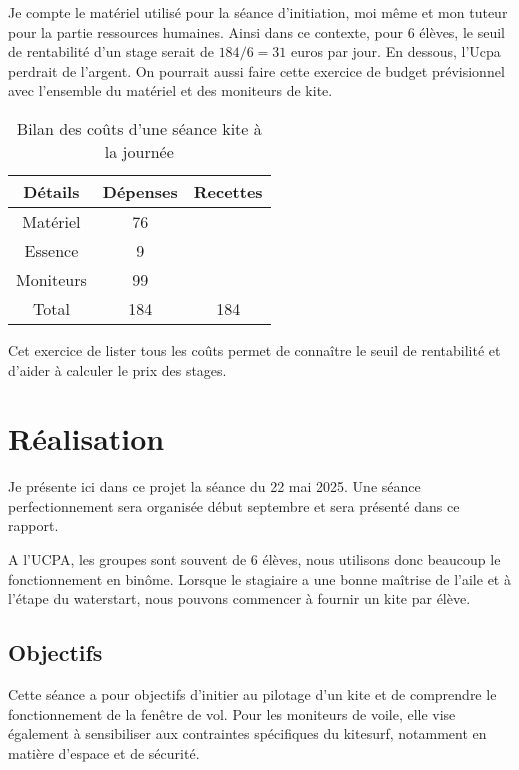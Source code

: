 \documentclass[11pt,a4paper]{report}
\begin{document}
Je compte le matériel utilisé pour la séance d’initiation,
moi m\^eme et mon tuteur pour la partie ressources humaines.
Ainsi dans ce contexte,  pour 6 élèves, le seuil de rentabilité
d'un stage serait de $184/6 = 31$ euros
par jour. En dessous, l'Ucpa perdrait de l'argent.
On pourrait aussi faire cette exercice de budget prévisionnel avec
l'ensemble du matériel et des moniteurs de kite.

\begin{table}
\begin{centering}
\begin{tabular}{|c|c|c|}
\hline
\textbf{Détails}         & \textbf{Dépenses} & \textbf{Recettes}   \\
\hline
Matériel  & 76     &                     \\
\hline                                    
Essence   & 9      &                     \\
\hline              
Moniteurs  & 99    &                     \\
\hline
Total     & 184    &       184           \\
\hline
\end{tabular}
\caption{Bilan des co\^uts d'une séance kite à la journée\label{cout_journalier}}
\end{centering}
\end{table}

Cet exercice de lister tous les co\^uts permet de connaître le seuil 
de rentabilité et d'aider à calculer le prix des stages.

\section{Réalisation}
Je présente ici dans ce projet la séance du 22 mai 2025.
Une séance perfectionnement sera organisée début septembre
et sera présenté dans ce rapport.

A l'UCPA, les groupes sont souvent de 6 élèves, nous
utilisons donc beaucoup le fonctionnement en bin\^ome. 
Lorsque le stagiaire a une bonne maîtrise de l'aile et
à l'étape du waterstart, nous pouvons commencer à fournir
un kite par élève.
\subsection{Objectifs}
Cette séance a pour objectifs d’initier au pilotage d’un kite et
de comprendre le fonctionnement de la fenêtre de vol. 
Pour les moniteurs de voile, elle vise également à 
sensibiliser aux contraintes spécifiques du kitesurf, 
notamment en matière d’espace et de sécurité.
 
\end{document}
